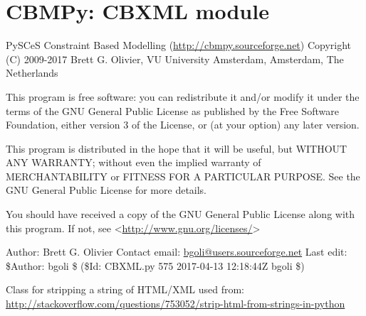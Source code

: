 \documentclass[a4paper,11pt,english]{sphinxmanual}
\begin{document}
\label{modules_doc:module-cbmpy.CBXML}

\section{CBMPy: CBXML module}
\label{modules_doc:cbmpy-cbxml-module}
PySCeS Constraint Based Modelling (\url{http://cbmpy.sourceforge.net})
Copyright (C) 2009-2017 Brett G. Olivier, VU University Amsterdam, Amsterdam, The Netherlands

This program is free software: you can redistribute it and/or modify
it under the terms of the GNU General Public License as published by
the Free Software Foundation, either version 3 of the License, or
(at your option) any later version.

This program is distributed in the hope that it will be useful,
but WITHOUT ANY WARRANTY; without even the implied warranty of
MERCHANTABILITY or FITNESS FOR A PARTICULAR PURPOSE.  See the
GNU General Public License for more details.

You should have received a copy of the GNU General Public License
along with this program.  If not, see \textless{}\url{http://www.gnu.org/licenses/}\textgreater{}

Author: Brett G. Olivier
Contact email: \href{mailto:bgoli@users.sourceforge.net}{bgoli@users.sourceforge.net}
Last edit: \$Author: bgoli \$ (\$Id: CBXML.py 575 2017-04-13 12:18:44Z bgoli \$)

\begin{fulllineitems}
\label{modules_doc:cbmpy.CBXML.MLStripper}
Class for stripping a string of HTML/XML used from:
\url{http://stackoverflow.com/questions/753052/strip-html-from-strings-in-python}

\end{fulllineitems}

\end{document}
